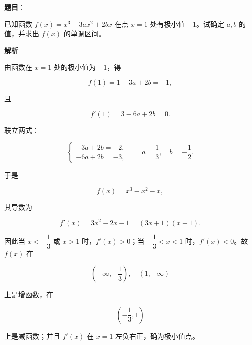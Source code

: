 \begin{answer}

\textbf{题目}：

已知函数 $f(x)=x^3-3ax^2+2bx$ 在点 $x=1$ 处有极小值 $-1$。试确定 $a,b$ 的值，并求出 $f(x)$ 的单调区间。

\textbf{解析}

由函数在 $x=1$ 处的极小值为 $-1$，得

\nopagebreak[4]
\[
f(1)=1-3a+2b=-1,
\]

且

\nopagebreak[4]
\[
f'(1)=3-6a+2b=0.
\]

联立两式：

\nopagebreak[4]
\[
\begin{cases}
-3a+2b=-2,\\
-6a+2b=-3,
\end{cases}
\qquad
a=\frac13,\quad b=-\frac12.
\]

于是

\nopagebreak[4]
\[
f(x)=x^3-x^2-x,
\]

其导数为

\nopagebreak[4]
\[
f'(x)=3x^2-2x-1=(3x+1)(x-1).
\]

因此当 $x<-\dfrac13$ 或 $x>1$ 时，$f'(x)>0$；当 $-\dfrac13<x<1$ 时，$f'(x)<0$。故 $f(x)$ 在

\nopagebreak[4]
\[
\left(-\infty,-\frac13\right),\quad(1,+\infty)
\]

上是增函数，在

\nopagebreak[4]
\[
\left(-\frac13,1\right)
\]

上是减函数；并且 $f'(x)$ 在 $x=1$ 左负右正，确为极小值点。


\end{answer}
